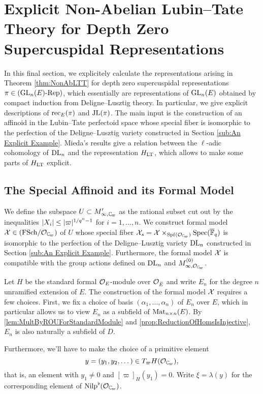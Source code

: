 \documentclass[../main.tex]{subfiles}
\begin{document}
\section{Explicit Non-Abelian Lubin--Tate Theory for Depth Zero Supercuspidal
Representations} %
\label{sec:Explicit Non-Abelian Lubin-Tate Theory for Depth Zero Supercuspidal Representations}

In this final section, we explicitely calculate the representations
arising in Theorem \ref{thm:NonAbLTT} for depth zero supercuspidal
representations $\pi \in {({\operatorname{GL}_n(E)}\text-\allowbreak\mathrm{Rep})}$, which essentially are representations
of $\operatorname{GL}_n(E)$
obtained by compact induction from Deligne--Lusztig theory. In
particular, we give explicit descriptions of $\mathrm{rec}_E(\pi)$ and $\mathrm{JL}(\pi)$. 
The main input is the construction of an affinoid in the Lubin--Tate perfectoid
space whose special fiber is isomorphic to the perfection of the 
Deligne--Lusztig variety constructed in Section \ref{sub:An Explicit Example}.
Mieda's results give a relation between the $\ell$-adic cohomology of $\mathrm{DL}_n$
and the representation $H_{\mathrm{LT}}$, which allows to make some parts of $H_{\mathrm{LT}}$
explicit.

\subsection{The Special Affinoid and its Formal Model} %
\label{sub:The Special Affinoid}
We define the subspace $U \subset M'_{\infty,\Cp}$ as the rational
subset cut out by the inequalities $\lvert X_i \rvert \leq \lvert \varpi \rvert^{1/q^n-1}$ for
$i = 1, \dots, n$. We construct formal model $\cX \in \FSchOver {\cO_{\Cp}}$
of $U$ whose special fiber $\cX_s = 
\cX \times_{\spf(\cO_{\Cp})}\spec(\bar \FF_q)$ is isomorphic to the perfection of the
Deligne--Lusztig variety $\mathrm{DL}_n$ constructed in Section \ref{sub:An Explicit Example}.
Furthermore, the formal model $\mathcal{X}$ is compatible with the group actions
defined on $\mathrm{DL}_n$ and $M_{\infty, \cO_\Cp}^{(0)}$. 

Let $H$ be the standard formal $\mathcal{O}_E$-module over $\mathcal{O}_{\breve {E}}$ and write
$E_n$ for the degree $n$ unramified extension of $E$. 
The construction of the formal model $\mathcal{X}$ requires a few choices. 
First, we fix a choice of basis $(\alpha_1, \dots, \alpha_n)$ of $E_n$ over $E$, 
which in particular allows us to view $E_n$ as a subfield of $\operatorname{Mat}_{n \times n}(E)$. 
By \cref{lem:MultByROUForStandardModule} and 
\cref{prop:ReductionOfHomsIsInjective}, $E_n$ is also naturally a subfield of
$D$.

Furthermore, we'll have to make the choice of a primitive element 
$$y = (y_1, y_2, \dots) \in T_\varpi H(\cO_\Cp),$$ that is,
an element with $y_1 \neq 0$ and $[\varpi]_H(y_1) = 0$. Write $\xi = \lambda(y)$ 
for the corresponding element of $\Nilp^\flat(\cO_\Cp)$. 
\end{document}
